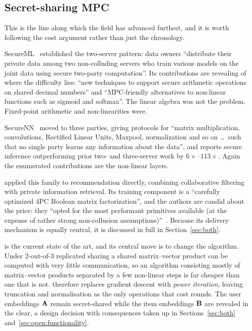 \subsection{Secret-sharing MPC}
\label{sec:training:mpc}

This is the line along which the field has advanced furthest, and it is worth following the cost
argument rather than just the chronology.

SecureML~\cite{secureml2017} established the two-server pattern: data owners ``distribute their
private data among two non-colluding servers who train various models on the joint data using
secure two-party computation''. Its contributions are revealing of where the difficulty lies:
``new techniques to support secure arithmetic operations on shared decimal numbers'' and
``MPC-friendly alternatives to non-linear functions such as sigmoid and softmax''. The linear
algebra was not the problem. Fixed-point arithmetic and non-linearities were.

SecureNN~\cite{securenn2019} moved to three parties, giving protocols for ``matrix multiplication,
convolutions, Rectified Linear Units, Maxpool, normalization and so on \dots\ such that no single
party learns any information about the data'', and reports secure inference outperforming prior
two- and three-server work by $6\times$--$113\times$. Again the enumerated contributions are the
non-linear layers.

\pirsona{} applied this family to recommendation directly, combining collaborative filtering with
private information retrieval. Its training component is a ``carefully optimized 4PC Boolean
matrix factorization'', and the authors are candid about the price: they ``opted for the most
performant primitives available (at the expense of rather strong non-collusion
assumptions)''~\cite{pirsona2021}. Because its delivery mechanism is equally central, it is
discussed in full in Section~\ref{sec:both}.

\nudge{} is the current state of the art, and its central move is to change the algorithm. Under
$2$-out-of-$3$ replicated sharing a shared matrix--vector product can be computed with very little
communication, so an algorithm consisting mostly of matrix--vector products separated by a few
non-linear steps is far cheaper than one that is not. \nudgeplain{} therefore replaces gradient
descent with \emph{power iteration}, leaving truncation and normalisation as the only operations
that cost rounds. The user embeddings $\mathbf{A}$ remain secret-shared while the item embeddings
$\mathbf{B}$ are revealed in the clear, a design decision with consequences taken up in
Sections~\ref{sec:both} and~\ref{sec:open:functionality}.

